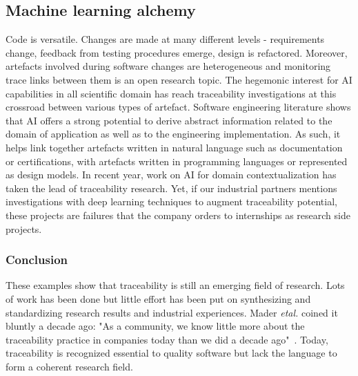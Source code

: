 \subsection{Machine learning alchemy}
Code is versatile. Changes are made at many different levels - requirements change, feedback from testing procedures emerge, design is refactored. Moreover, artefacts involved during software changes are heterogeneous and monitoring trace links between them is an open research topic. 
The hegemonic interest for AI capabilities in all scientific domain has reach traceability investigations at this crossroad between various types of artefact. Software engineering literature shows that AI offers a strong potential to derive abstract information related to the domain of application as well as to the engineering implementation. As such, it helps link together artefacts written in natural language such as documentation or certifications, with artefacts written in programming languages or represented as design models. In recent year, work on AI for domain contextualization has taken the lead of traceability research\cite{clelandhuang2014-traceability-trends-and-futurte-direction,borg2014-SmS-IR-for-traceability}. 
Yet, if our industrial partners mentions investigations with deep learning techniques to augment traceability potential, these projects are failures that the company orders to internships as research side projects.

\subsubsection{Conclusion}
These examples show that traceability is still an emerging field of research. Lots of work has been done but little effort has been put on synthesizing and standardizing research results and industrial experiences. 
Mader \textit{etal.} coined it bluntly a decade ago: "As a community, we know little more about the traceability practice in companies today than we did a decade ago"~\cite{mader2009-motivation-matters-in-traceability-practitioner-survey}.
Today, traceability is recognized essential to quality software but lack the language to form a coherent research field.




